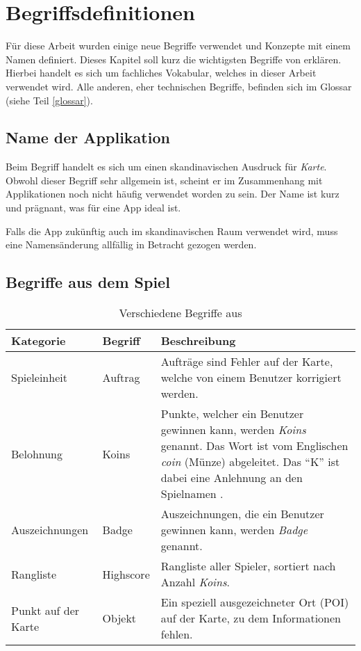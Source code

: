 \chapter{Begriffsdefinitionen}
\label{kort-definitionen}

Für diese Arbeit wurden einige neue Begriffe verwendet und Konzepte mit einem Namen definiert.
Dieses Kapitel soll kurz die wichtigsten Begriffe von \kort{} erklären.
Hierbei handelt es sich um fachliches Vokabular, welches in dieser Arbeit verwendet wird.
Alle anderen, eher technischen Begriffe, befinden sich im Glossar (siehe Teil \ref{glossar}).

\section{Name der Applikation}
Beim Begriff \kort{} handelt es sich um einen skandinavischen Ausdruck für \emph{Karte}.
Obwohl dieser Begriff sehr allgemein ist, scheint er im Zusammenhang mit Applikationen noch nicht häufig verwendet worden zu sein.
Der Name ist kurz und prägnant, was für eine App ideal ist.

Falls die App zukünftig auch im skandinavischen Raum verwendet wird, muss eine Namensänderung allfällig in Betracht gezogen werden.

\section{Begriffe aus dem Spiel}

\begin{table}[H]
\centering
\begin{tabular}{|p{0.2\threecelltabwidth}|p{0.12\threecelltabwidth}|p{0.68\threecelltabwidth}|}
\hline 
\small{\textbf{Kategorie}} & \small{\textbf{Begriff}} & \small{\textbf{Beschreibung}} \\
\hline 
Spieleinheit & Auftrag & Aufträge sind Fehler auf der Karte, welche von einem Benutzer korrigiert werden. \\
\hline 
Belohnung & Koins & Punkte, welcher ein Benutzer gewinnen kann, werden \emph{Koins} genannt.
Das Wort ist vom Englischen \emph{coin} (Münze) abgeleitet. 
Das "`K"' ist dabei eine Anlehnung an den Spielnamen \kort{}. \\
\hline 
Auszeichnungen & Badge & Auszeichnungen, die ein Benutzer gewinnen kann, werden \emph{Badge} genannt. \\
\hline 
Rangliste & Highscore & Rangliste aller Spieler, sortiert nach Anzahl \emph{Koins}. \\
\hline 
Punkt auf der Karte & Objekt & Ein speziell ausgezeichneter Ort (\gls{POI}) auf der Karte, zu dem Informationen fehlen. \\
\hline 
\end{tabular}
\caption{Verschiedene Begriffe aus \kort{}}
\label{table-definitionen}
\end{table}